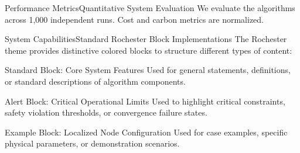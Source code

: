 \begin{frame}{Performance Metrics}{Quantitative System Evaluation}
  We evaluate the algorithms across 1,000 independent runs. Cost and carbon metrics are normalized.
  \vspace{0.4cm}
  
  \centering
\end{frame}

\begin{frame}{System Capabilities}{Standard Rochester Block Implementations}
  The Rochester theme provides distinctive colored blocks to structure different types of content:
  \vspace{0.2cm}
  
  \begin{block}{Standard Block: Core System Features}
    Used for general statements, definitions, or standard descriptions of algorithm components.
  \end{block}
  
  \begin{alertblock}{Alert Block: Critical Operational Limits}
    Used to highlight critical constraints, safety violation thresholds, or convergence failure states.
  \end{alertblock}
  
  \begin{exampleblock}{Example Block: Localized Node Configuration}
    Used for case examples, specific physical parameters, or demonstration scenarios.
  \end{exampleblock}
\end{frame}

